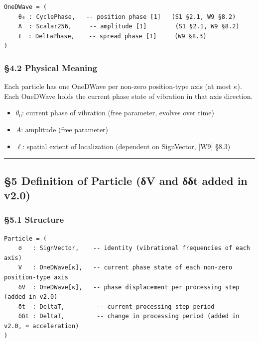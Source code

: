 \documentclass[a4paper,11pt]{article}
\providecommand{\tightlist}{\setlength{\itemsep}{0pt}\setlength{\parskip}{0pt}}
\begin{document}
\begin{verbatim}
OneDWave = (
    θ₀ : CyclePhase,   -- position phase [1]   (S1 §2.1, W9 §8.2)
    A  : Scalar256,     -- amplitude [1]        (S1 §2.1, W9 §8.2)
    ℓ  : DeltaPhase,    -- spread phase [1]     (W9 §8.3)
)
\end{verbatim}

\subsubsection{§4.2 Physical Meaning}\label{physical-meaning-1}

Each particle has one OneDWave per non-zero position-type axis (at most
\(\kappa\)). Each OneDWave holds the current phase state of vibration in
that axis direction.

\begin{itemize}
\tightlist
\item
  \(\theta_0\): current phase of vibration (free parameter, evolves over
  time)
\item
  \(A\): amplitude (free parameter)
\item
  \(\ell\): spatial extent of localization (dependent on SignVector,
  {[}W9{]} §8.3)
\end{itemize}

\begin{center}\rule{0.5\linewidth}{0.5pt}\end{center}

\subsection{§5 Definition of Particle (δV and δδt added in
v2.0)}\label{definition-of-particle-ux3b4v-and-ux3b4ux3b4t-added-in-v2.0}

\subsubsection{§5.1 Structure}\label{structure-1}

\begin{verbatim}
Particle = (
    σ   : SignVector,    -- identity (vibrational frequencies of each axis)
    V   : OneDWave[κ],   -- current phase state of each non-zero position-type axis
    δV  : OneDWave[κ],   -- phase displacement per processing step (added in v2.0)
    δt  : DeltaT,         -- current processing step period
    δδt : DeltaT,         -- change in processing period (added in v2.0, ≈ acceleration)
)
\end{verbatim}
\end{document}
